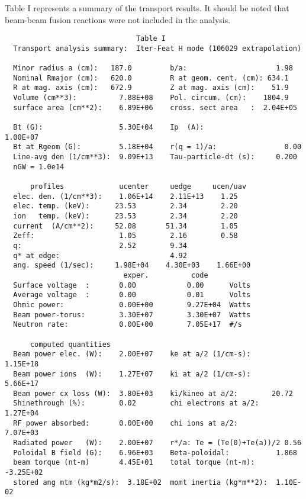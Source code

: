         Table I represents a summary of the transport results.
        It should be noted that beam-beam fusion reactions were not
        included in the analysis.
        \begin{verbatim}
                               Table I             
  Transport analysis summary:  Iter-Feat H mode (106029 extrapolation)
 
  Minor radius a (cm):   187.0         b/a:                     1.98
  Nominal Rmajor (cm):   620.0         R at geom. cent. (cm): 634.1
  R at mag. axis (cm):   672.9         Z at mag. axis (cm):    51.9
  Volume (cm**3):          7.88E+08    Pol. circum. (cm):    1804.9
  surface area (cm**2):    6.89E+06    cross. sect area   :  2.04E+05

  Bt (G):                  5.30E+04    Ip  (A):                 1.00E+07
  Bt at Rgeom (G):         5.18E+04    r(q = 1)/a:                0.00
  Line-avg den (1/cm**3):  9.09E+13    Tau-particle-dt (s):     0.200
  nGW = 1.0e14

      profiles             ucenter     uedge     ucen/uav
  elec. den. (1/cm**3):    1.06E+14    2.11E+13    1.25
  elec. temp. (keV):      23.53        2.34        2.20
  ion   temp. (keV):      23.53        2.34        2.20
  current  (A/cm**2):     52.08       51.34        1.05
  Zeff:                    1.05        2.16        0.58
  q:                       2.52        9.34
  q* at edge:                          4.92
  ang. speed (1/sec):     1.98E+04    4.30E+03    1.66E+00
                            exper.          code
  Surface voltage  :       0.00            0.00      Volts
  Average voltage  :       0.00            0.01      Volts
  Ohmic power:             0.00E+00        9.27E+04  Watts
  Beam power-torus:        3.30E+07        3.30E+07  Watts
  Neutron rate:            0.00E+00        7.05E+17  #/s
 
      computed quantities
  Beam power elec. (W):    2.00E+07    ke at a/2 (1/cm-s):      1.15E+18
  Beam power ions  (W):    1.27E+07    ki at a/2 (1/cm-s):      5.66E+17
  Beam power cx loss (W):  3.80E+03    ki/kineo at a/2:        20.72
  Shinethrough (%):        0.02        chi electrons at a/2:    1.27E+04
  RF power absorbed:       0.00E+00    chi ions at a/2:         7.07E+03
  Radiated power   (W):    2.00E+07    r*/a: Te = (Te(0)+Te(a))/2 0.56
  Poloidal B field (G):    6.96E+03    Beta-poloidal:           1.868
  beam torque (nt-m)       4.45E+01    total torque (nt-m):    -3.25E+02
  stored ang mtm (kg*m2/s):  3.18E+02  momt inertia (kg*m**2):  1.10E-02
 

\end{verbatim}

